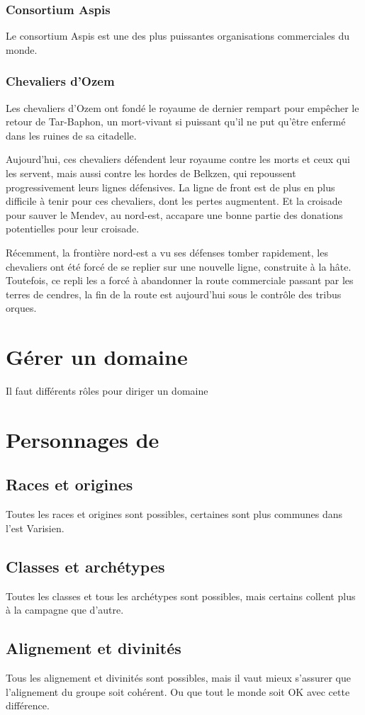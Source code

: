 \documentclass[letterpaper,10pt,twoside,twocolumn,openany]{book}
\begin{document}
\subsection{Consortium Aspis}
Le consortium Aspis est une des plus puissantes organisations commerciales du monde.
\subsection{Chevaliers d'Ozem}
Les chevaliers d'Ozem ont fondé le royaume de dernier rempart pour empêcher le retour de Tar-Baphon, un mort-vivant si puissant qu'il ne put qu'être enfermé dans les ruines de sa citadelle.

Aujourd'hui, ces chevaliers défendent leur royaume contre les morts et ceux qui les servent, mais aussi contre les hordes de Belkzen, qui repoussent progressivement leurs lignes défensives. La ligne de front est de plus en plus difficile à tenir pour ces chevaliers, dont les pertes augmentent. Et la croisade pour sauver le Mendev, au nord-est, accapare une bonne partie des donations potentielles pour leur croisade.

Récemment, la frontière nord-est a vu ses défenses tomber rapidement, les chevaliers ont été forcé de se replier sur une nouvelle ligne, construite à la hâte. Toutefois, ce repli les a forcé à abandonner la route commerciale passant par les terres de cendres, la fin de la route est aujourd'hui sous le contrôle des tribus orques.
\chapter{Gérer un domaine}
Il faut différents rôles pour diriger un domaine
\chapter{Personnages de \nomcampagne}
\section{Races et origines}
Toutes les races et origines sont possibles, certaines sont plus communes dans l'est Varisien.
\section{Classes et archétypes}
Toutes les classes et tous les archétypes sont possibles, mais certains collent plus à la campagne que d'autre.
\section{Alignement et divinités}
Tous les alignement et divinités sont possibles, mais il vaut mieux s'assurer que l'alignement du groupe soit cohérent. Ou que tout le monde soit OK avec cette différence.
\end{document}
